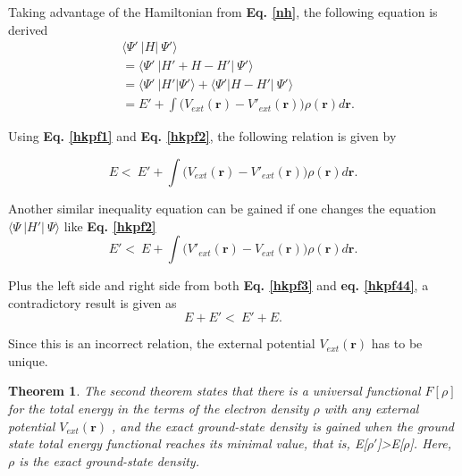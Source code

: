 \documentclass[a4paper, 12pt, titlepage,oneside,drop]{kthesis}
\newtheorem{thm}{Theorem}
\begin{document}
Taking advantage of the Hamiltonian from \textbf{Eq. \ref{nh}}, the following equation is derived
\begin{equation}\label{hkpf2}\begin{split}
&    \langle \Psi'\ |{H}|\ \Psi' \rangle \\
&  = \langle \Psi'\ |{H'} + {H} - {H'}|\ \Psi' \rangle \\
&  = \langle \Psi'\ |{H'} |\Psi' \rangle + \langle \Psi' | {H} - {H'}|\ \Psi' \rangle \\
&  = E' + \int \Big( V_{ext}(\textbf{r}) - V'_{ext}(\textbf{r}) \Big)  \rho(\textbf{r}) d \textbf{r}.
\end{split}\end{equation}

Using \textbf{Eq. \ref{hkpf1}} and \textbf{Eq. \ref{hkpf2}}, the following relation is given by

\begin{equation}\label{hkpf3}
 E  < \  E' + \int \Big( V_{ext}(\textbf{r}) - V'_{ext}(\textbf{r}) \Big)  \rho(\textbf{r}) d \textbf{r} .
\end{equation}

Another similar inequality equation can be gained if one changes the equation $\langle \Psi\ |{H'}|\ \Psi \rangle$ like \textbf{Eq. \ref{hkpf2}}
\begin{equation}\label{hkpf44}
  E'  < \  E + \int \Big( V'_{ext}(\textbf{r}) - V_{ext}(\textbf{r}) \Big)  \rho(\textbf{r}) d \textbf{r} .
\end{equation}

Plus the left side and right side from both \textbf{Eq. \ref{hkpf3}} and \textbf{eq. \ref{hkpf44}}, a contradictory result is given as
\begin{equation}\label{hkpf4}
  E + E'  < \  E' + E.
\end{equation}

Since this is an incorrect relation, the external potential $V_{ext}(\textbf{r})$ has to be unique.

\begin{thm}
\label{hk2}
\noindent The second theorem states that there is a universal functional $F[\rho]$ for the total energy in the terms of the electron density $\rho$ with any external potential $V_{ext}(\textbf{r})$ ,
and the exact ground-state density is gained when the ground state total energy functional reaches its minimal value, that is, E[$\rho'$]>E[$\rho$]. Here, $\rho$ is the exact ground-state density.
\end{thm}
\end{document}

